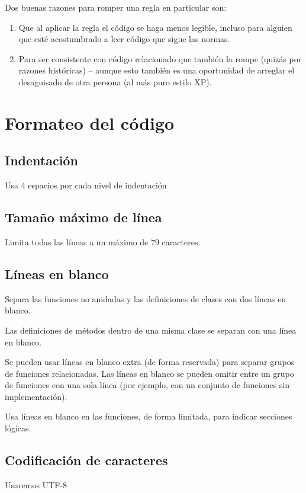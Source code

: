 \documentclass[a4paper,11pt,oneside]{book}
\begin{document}
Dos buenas razones para romper una regla en particular son:

\begin{enumerate}
\item Que al aplicar la regla el código se haga menos legible, incluso para alguien que esté acostumbrado a leer código que sigue las normas.
\item Para ser consistente con código relacionado que también la rompe (quizás por razones históricas) -- aunque esto también es una oportunidad de arreglar el desaguisado de otra persona (al más puro estilo XP).
\end{enumerate}

\section{Formateo del código}
\subsection{Indentación}
Usa 4 espacios por cada nivel de indentación

\subsection{Tamaño máximo de línea}
Limita todas las líneas a un máximo de 79 caracteres.

\subsection{Líneas en blanco}
Separa las funciones no anidadas y las definiciones de clases con dos líneas en blanco.

Las definiciones de métodos dentro de una misma clase se separan con una línea en blanco.

Se pueden usar líneas en blanco extra (de forma reservada) para separar grupos de funciones relacionadas. Las líneas en blanco se pueden omitir entre un grupo de funciones con una sola línea (por ejemplo, con un conjunto de funciones sin implementación).

Usa líneas en blanco en las funciones, de forma limitada, para indicar secciones lógicas.

\subsection{Codificación de caracteres}

Usaremos UTF-8
\end{document}
